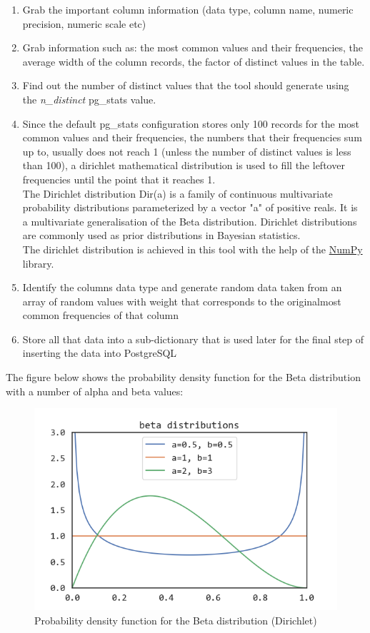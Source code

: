 \begin{enumerate}
\item{Grab the important column information (data type, column name, numeric precision, numeric scale etc)}
\item{Grab information such as: the most common values and their frequencies, the average width of the column records, the factor of distinct values in the table.}
\item{Find out the number of distinct values that the tool should generate using the \textit{n\_distinct} pg\_stats value.}
\item{Since the default pg\_stats configuration stores only 100 records for the most common values and their frequencies, the numbers that their frequencies sum up to, usually does not reach 1 (unless the number of distinct values is less than 100), a dirichlet mathematical distribution is used to fill the leftover frequencies until the point that it reaches 1.\\
The Dirichlet distribution Dir(a) is a family of continuous multivariate probability distributions parameterized by a vector "a" of positive reals. It is a multivariate generalisation of the Beta distribution. Dirichlet distributions are commonly used as prior distributions in Bayesian statistics. \cite{WhatIsDirichletDistribution} \\
The dirichlet distribution is achieved in this tool with the help of the \href{https://numpy.org/}{NumPy} library.}
\item{Identify the columns data type and generate random data taken from an array of random values with weight that corresponds to the originalmost common frequencies of that column}
\item{Store all that data into a sub-dictionary that is used later for the final step of inserting the data into PostgreSQL}
\end{enumerate}
The figure below shows the probability density function for the Beta distribution with a number of alpha and beta values: \cite{DirichletDistributionSueLiu}
\begin{figure}[H]
	\includegraphics[width=\linewidth]{./Figures/ToolEvaluation/dirichlet_distribution.png}
	\caption{Probability density function for the Beta distribution (Dirichlet) \cite{DirichletDistributionSueLiu}}
\end{figure}
\newpage

